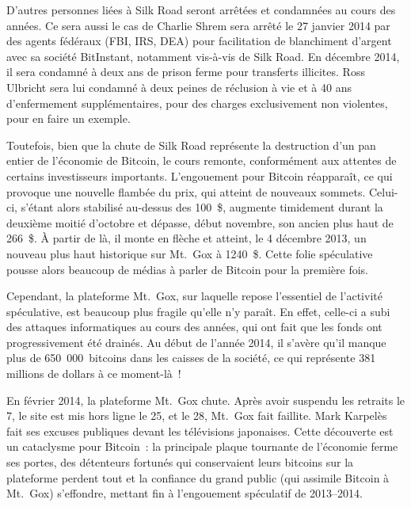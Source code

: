 D'autres personnes liées à Silk Road seront arrêtées et condamnées au cours des années. Ce sera aussi le cas de Charlie Shrem sera arrêté le 27 janvier 2014 par des agents fédéraux (FBI, IRS, DEA) pour facilitation de blanchiment d'argent avec sa société BitInstant, notamment vis-à-vis de Silk Road. En décembre 2014, il sera condamné à deux ans de prison ferme pour transferts illicites. Ross Ulbricht sera lui condamné à deux peines de réclusion à vie et à 40 ans d'enfermement supplémentaires, pour des charges exclusivement non violentes, pour en faire un exemple.

Toutefois, bien que la chute de Silk Road représente la destruction d'un pan entier de l'économie de Bitcoin, le cours remonte, conformément aux attentes de certains investisseurs importants. L'engouement pour Bitcoin réapparaît, ce qui provoque une nouvelle flambée du prix, qui atteint de nouveaux sommets. Celui-ci, s'étant alors stabilisé au-dessus des 100~\$, augmente timidement durant la deuxième moitié d'octobre et dépasse, début novembre, son ancien plus haut de 266~\$. À partir de là, il monte en flèche et atteint, le 4 décembre 2013, un nouveau plus haut historique sur Mt.~Gox à 1240~\$. Cette folie spéculative pousse alors beaucoup de médias à parler de Bitcoin pour la première fois.

Cependant, la plateforme Mt.~Gox, sur laquelle repose l'essentiel de l'activité spéculative, est beaucoup plus fragile qu'elle n'y paraît. En effet, celle-ci a subi des attaques informatiques au cours des années, qui ont fait que les fonds ont progressivement été drainés. Au début de l'année 2014, il s'avère qu'il manque plus de 650~000~bitcoins dans les caisses de la société, ce qui représente 381 millions de dollars à ce moment-là~!

En février 2014, la plateforme Mt.~Gox chute. Après avoir suspendu les retraits le 7, le site est mis hors ligne le 25, et le 28, Mt.~Gox fait faillite. Mark Karpelès fait ses excuses publiques devant les télévisions japonaises. Cette découverte est un cataclysme pour Bitcoin~: la principale plaque tournante de l'économie ferme ses portes, des détenteurs fortunés qui conservaient leurs bitcoins sur la plateforme perdent tout et la confiance du grand public (qui assimile Bitcoin à Mt.~Gox) s'effondre, mettant fin à l'engouement spéculatif de 2013--2014.

